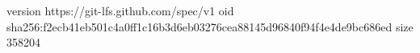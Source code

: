 version https://git-lfs.github.com/spec/v1
oid sha256:f2ecb41eb501c4a0ff1c16b3d6eb03276cea88145d96840f94f4e4de9bc686ed
size 358204
